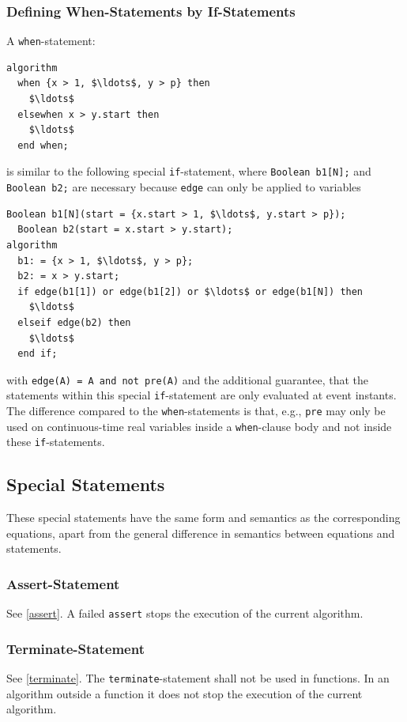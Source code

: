 \subsubsection{Defining When-Statements by If-Statements}\label{defining-when-statements-by-if-statements}

A \lstinline!when!-statement:
\begin{lstlisting}[language=modelica]
algorithm
  when {x > 1, $\ldots$, y > p} then
    $\ldots$
  elsewhen x > y.start then
    $\ldots$
  end when;
\end{lstlisting}
is similar to the following special \lstinline!if!-statement, where \lstinline!Boolean b1[N];! and \lstinline!Boolean b2;! are necessary because \lstinline!edge! can only be applied to variables
\begin{lstlisting}[language=modelica]
  Boolean b1[N](start = {x.start > 1, $\ldots$, y.start > p});
  Boolean b2(start = x.start > y.start);
algorithm
  b1: = {x > 1, $\ldots$, y > p};
  b2: = x > y.start;
  if edge(b1[1]) or edge(b1[2]) or $\ldots$ or edge(b1[N]) then
    $\ldots$
  elseif edge(b2) then
    $\ldots$
  end if;
\end{lstlisting}
with \lstinline!edge(A) = A and not pre(A)! and the additional guarantee, that the statements within this special \lstinline!if!-statement are only evaluated at event instants.
The difference compared to the \lstinline!when!-statements is that, e.g., \lstinline!pre! may only be used on continuous-time real variables inside a \lstinline!when!-clause body and not inside these \lstinline!if!-statements.

\subsection{Special Statements}\label{special-statements}

These special statements have the same form and semantics as the corresponding equations, apart from the general difference in semantics between equations and statements.

\subsubsection{Assert-Statement}\label{assert-statement}

See \cref{assert}.
A failed \lstinline!assert! stops the execution of the current algorithm.

\subsubsection{Terminate-Statement}\label{terminate-statement}

See \cref{terminate}.
The \lstinline!terminate!-statement shall not be used in functions.
In an algorithm outside a function it does not stop the execution of the current algorithm.
